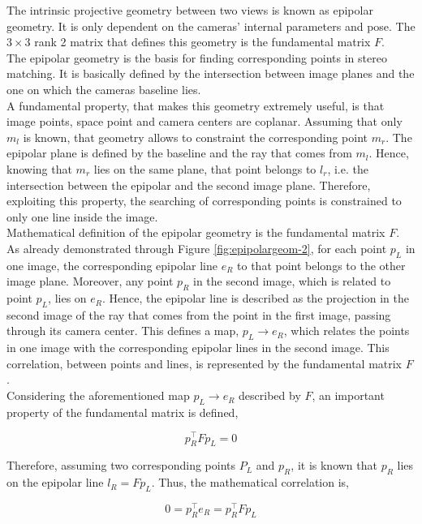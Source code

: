 The intrinsic projective geometry between two views is known as epipolar geometry.
It is only dependent on the cameras' internal parameters and pose.
The $3 \times 3$ rank 2 matrix that defines this geometry is the fundamental matrix $F$.\\
The epipolar geometry is the basis for finding corresponding points in stereo matching. 
It is basically defined by the intersection between image planes and the one on which the cameras baseline lies.\\
A fundamental property, that makes this geometry extremely useful, is that image points, space point and camera centers are coplanar. 
Assuming that only $m_l$ is known, that geometry allows to constraint the corresponding point $m_r$. 
The epipolar plane is defined by the baseline and the ray that comes from $m_l$. 
Hence, knowing that $m_r$ lies on the same plane, that point belongs to $l_r$, i.e. the intersection between the epipolar and the second image plane. 
Therefore, exploiting this property, the searching of corresponding points is constrained to only one line inside the image.\\
Mathematical definition of the epipolar geometry is the fundamental matrix $F$.
As already demonstrated through Figure \ref{fig:epipolargeom-2}, for each point $p_L$ in one image, the corresponding epipolar line $e_R$ to that point belongs to the other image plane. 
Moreover, any point $p_R$ in the second image, which is related to point $p_L$, lies on $e_R$.
Hence, the epipolar line is described as the projection in the second image of the ray that comes from the point in the first image, passing through its camera center.
This defines a map, $p_L \rightarrow e_R$, which relates the points in one image with the corresponding epipolar lines in the second image.
This correlation, between points and lines, is represented by the fundamental matrix $F$.\\
Considering the aforementioned map $p_L \rightarrow e_R$ described by $F$, an important property of the fundamental matrix is defined,

\begin{equation}
\label{eqn:fundmatprop}
	p_R^\top F p_L = 0
\end{equation}

Therefore, assuming two corresponding points $P_L$ and $p_R$, it is known that $p_R$ lies on the epipolar line $l_R = F p_L$. 
Thus, the mathematical correlation is,

\begin{equation}
	0 = p_R^\top e_R = p_R^\top F p_L
\end{equation}

